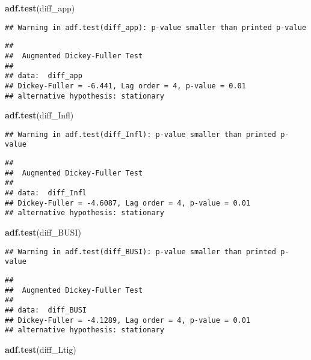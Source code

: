\documentclass[
]{article}
\newenvironment{Shaded}{\begin{snugshade}}{\end{snugshade}}
\newcommand{\FunctionTok}[1]{\textcolor[rgb]{0.13,0.29,0.53}{\textbf{#1}}}
\newcommand{\NormalTok}[1]{#1}
\begin{document}
\begin{Shaded}
\begin{Highlighting}[]
\FunctionTok{adf.test}\NormalTok{(diff\_app)}
\end{Highlighting}
\end{Shaded}

\begin{verbatim}
## Warning in adf.test(diff_app): p-value smaller than printed p-value
\end{verbatim}

\begin{verbatim}
## 
##  Augmented Dickey-Fuller Test
## 
## data:  diff_app
## Dickey-Fuller = -6.441, Lag order = 4, p-value = 0.01
## alternative hypothesis: stationary
\end{verbatim}

\begin{Shaded}
\begin{Highlighting}[]
\FunctionTok{adf.test}\NormalTok{(diff\_Infl)}
\end{Highlighting}
\end{Shaded}

\begin{verbatim}
## Warning in adf.test(diff_Infl): p-value smaller than printed p-value
\end{verbatim}

\begin{verbatim}
## 
##  Augmented Dickey-Fuller Test
## 
## data:  diff_Infl
## Dickey-Fuller = -4.6087, Lag order = 4, p-value = 0.01
## alternative hypothesis: stationary
\end{verbatim}

\begin{Shaded}
\begin{Highlighting}[]
\FunctionTok{adf.test}\NormalTok{(diff\_BUSI)}
\end{Highlighting}
\end{Shaded}

\begin{verbatim}
## Warning in adf.test(diff_BUSI): p-value smaller than printed p-value
\end{verbatim}

\begin{verbatim}
## 
##  Augmented Dickey-Fuller Test
## 
## data:  diff_BUSI
## Dickey-Fuller = -4.1289, Lag order = 4, p-value = 0.01
## alternative hypothesis: stationary
\end{verbatim}

\begin{Shaded}
\begin{Highlighting}[]
\FunctionTok{adf.test}\NormalTok{(diff\_Ltig)}
\end{Highlighting}
\end{Shaded}
\end{document}
